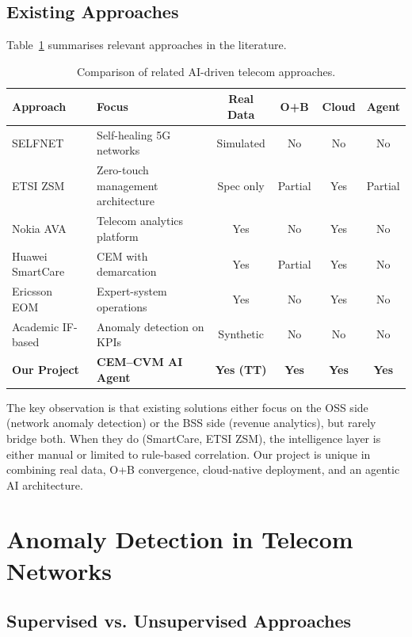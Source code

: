 \subsection{Existing Approaches}

Table~\ref{tab:related-work} summarises relevant approaches in the literature.

\begin{table}[H]
\centering
\caption{Comparison of related AI-driven telecom approaches.}
\label{tab:related-work}
\small
\begin{tabularx}{\textwidth}{@{}lXcccc@{}}
\toprule
\textbf{Approach} & \textbf{Focus} & \textbf{Real Data} & \textbf{O+B} & \textbf{Cloud} & \textbf{Agent} \\
\midrule
SELFNET~\cite{selfnet2017} & Self-healing 5G networks & Simulated & No & No & No \\
ETSI ZSM~\cite{etsi_zsm} & Zero-touch management architecture & Spec only & Partial & Yes & Partial \\
Nokia AVA~\cite{nokia_ava} & Telecom analytics platform & Yes & No & Yes & No \\
Huawei SmartCare~\cite{smartcare} & CEM with demarcation & Yes & Partial & Yes & No \\
Ericsson EOM~\cite{ericsson_eom} & Expert-system operations & Yes & No & Yes & No \\
Academic IF-based~\cite{if_telecom} & Anomaly detection on KPIs & Synthetic & No & No & No \\
\textbf{Our Project} & \textbf{CEM--CVM AI Agent} & \textbf{Yes (TT)} & \textbf{Yes} & \textbf{Yes} & \textbf{Yes} \\
\bottomrule
\end{tabularx}
\end{table}

The key observation is that existing solutions either focus on the OSS side (network anomaly detection) or the BSS side (revenue analytics), but rarely bridge both. When they do (SmartCare, ETSI ZSM), the intelligence layer is either manual or limited to rule-based correlation. Our project is unique in combining real data, O+B convergence, cloud-native deployment, and an agentic AI architecture.

\section{Anomaly Detection in Telecom Networks}

\subsection{Supervised vs. Unsupervised Approaches}

